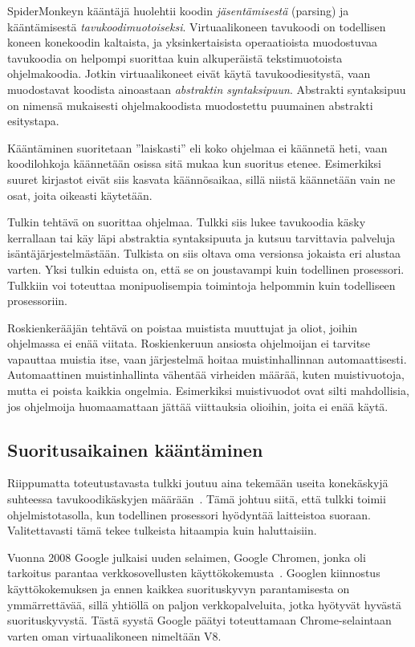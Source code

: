 SpiderMonkeyn kääntäjä huolehtii koodin \textit{jäsentämisestä} (parsing) ja kääntämisestä \textit{tavukoodimuotoiseksi}. Virtuaalikoneen tavukoodi on todellisen koneen konekoodin kaltaista, ja yksinkertaisista operaatioista muodostuvaa tavukoodia on helpompi suorittaa kuin alkuperäistä tekstimuotoista ohjelmakoodia. Jotkin virtuaalikoneet eivät käytä tavukoodiesitystä, vaan muodostavat koodista ainoastaan \textit{abstraktin syntaksipuun}. Abstrakti syntaksipuu on nimensä mukaisesti ohjelmakoodista muodostettu puumainen abstrakti esitystapa.

Kääntäminen suoritetaan ''laiskasti'' eli koko ohjelmaa ei käännetä heti, vaan koodilohkoja käännetään osissa sitä mukaa kun suoritus etenee. Esimerkiksi suuret kirjastot eivät siis kasvata käännösaikaa, sillä niistä käännetään vain ne osat, joita oikeasti käytetään.

Tulkin tehtävä on suorittaa ohjelmaa. Tulkki siis lukee tavukoodia käsky kerrallaan tai käy läpi abstraktia syntaksipuuta ja kutsuu tarvittavia palveluja isäntäjärjestelmästään. Tulkista on siis oltava oma versionsa jokaista eri alustaa varten. Yksi tulkin eduista on, että se on joustavampi kuin todellinen prosessori. Tulkkiin voi toteuttaa monipuolisempia toimintoja helpommin kuin todelliseen prosessoriin.

Roskienkerääjän tehtävä on poistaa muistista muuttujat ja oliot, joihin ohjelmassa ei enää viitata. Roskienkeruun ansiosta ohjelmoijan ei tarvitse vapauttaa muistia itse, vaan järjestelmä hoitaa muistinhallinnan automaattisesti. Automaattinen muistinhallinta vähentää virheiden määrää, kuten muistivuotoja, mutta ei poista kaikkia ongelmia. Esimerkiksi muistivuodot ovat silti mahdollisia, jos ohjelmoija huomaamattaan jättää viittauksia olioihin, joita ei enää käytä.

\subsection{Suoritusaikainen kääntäminen}


Riippumatta toteutustavasta tulkki joutuu aina tekemään useita konekäskyjä suhteessa tavukoodikäskyjen määrään~\cite[s.~35]{vms}. Tämä johtuu siitä, että tulkki toimii ohjelmistotasolla, kun todellinen prosessori hyödyntää laitteistoa suoraan. Valitettavasti tämä tekee tulkeista hitaampia kuin haluttaisiin.

Vuonna 2008 Google julkaisi uuden selaimen, Google Chromen, jonka oli tarkoitus parantaa verkkosovellusten käyttökokemusta~\cite{chromepress}. Googlen kiinnostus käyttökokemuksen ja ennen kaikkea suorituskyvyn parantamisesta on ymmärrettävää, sillä yhtiöllä on paljon verkkopalveluita, jotka hyötyvät hyvästä suorituskyvystä. Tästä syystä Google päätyi toteuttamaan Chrome-selaintaan varten oman virtuaalikoneen nimeltään V8.

